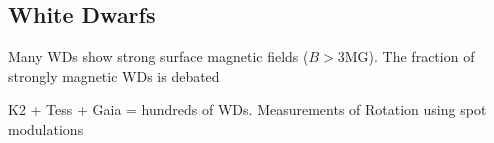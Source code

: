 {\color{red} \subsection{White Dwarfs}}
Many WDs show strong surface magnetic fields ($B>$3MG). The fraction of strongly magnetic WDs is debated  

K2 + Tess + Gaia = hundreds of WDs. Measurements of Rotation using spot modulations